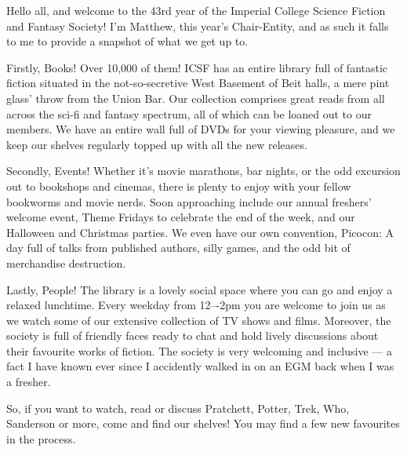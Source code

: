 Hello all, and welcome to the 43rd year of the Imperial College
Science Fiction and Fantasy Society!  I’m Matthew, this year’s
Chair-Entity, and as such it falls to me to provide a snapshot of what
we get up to.

Firstly, Books! Over 10,000 of them! ICSF has an entire library full
of fantastic fiction situated in the not-so-secretive West Basement of
Beit halls, a mere pint glass’ throw\footnotemark{} from the Union
Bar. Our collection comprises great reads from all across the sci-fi
and fantasy spectrum, all of which can be loaned out to our
members. We have an entire wall full of DVDs for your viewing
pleasure, and we keep our shelves regularly topped up with all the new
releases.

Secondly, Events! Whether it’s movie marathons, bar nights, or the odd
excursion out to bookshops and cinemas, there is plenty to enjoy with
your fellow bookworms and movie nerds. Soon approaching include our
annual freshers’ welcome event, Theme Fridays to celebrate the end of
the week, and our Halloween and Christmas parties. We even have our
own convention, Picocon: A day full of talks from published authors,
silly games, and the odd bit of merchandise destruction.

Lastly, People! The library is a lovely social space where you can go
and enjoy a relaxed lunchtime.  Every weekday from 12–-2pm you are
welcome to join us as we watch some of our extensive collection of TV
shows and films. Moreover, the society is full of friendly faces ready
to chat and hold lively discussions about their favourite works of
fiction. The society is very welcoming and inclusive --- a fact I have
known ever since I accidently walked in on an EGM back when I was a
fresher.

So, if you want to watch, read or discuss Pratchett, Potter, Trek,
Who, Sanderson or more, come and find our shelves! You may find a few
new favourites in the process.
